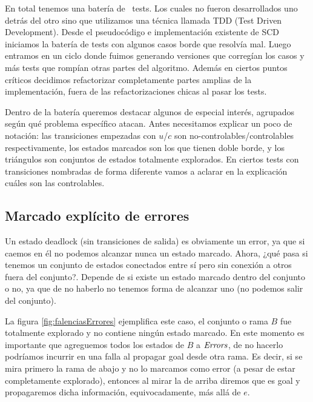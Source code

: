 En total tenemos una batería de \totalTests\ tests. Los cuales no fueron desarrollados uno detrás del otro sino que utilizamos una técnica llamada TDD (Test Driven Development). Desde el pseudocódigo e implementación existente de SCD iniciamos la batería de tests con algunos casos borde que resolvía mal.
Luego entramos en un ciclo donde fuimos generando versiones que corregían los casos y más tests que rompían otras partes del algoritmo. Además en ciertos puntos críticos decidimos refactorizar completamente partes amplias de la implementación, fuera de las refactorizaciones chicas al pasar los tests.

Dentro de la batería queremos destacar algunos de especial interés, agrupados según qué problema específico atacan. Antes necesitamos explicar un poco de notación: las transiciones empezadas con $u$/$c$ son no-controlables/controlables respectivamente, los estados marcados son los que tienen doble borde, y los triángulos son conjuntos de estados totalmente explorados. En ciertos tests con transiciones nombradas de forma diferente vamos a aclarar en la explicación cuáles son las controlables.
\bigskip

\FloatBarrier
\subsection{Marcado explícito de errores}\label{marcarErrores}

Un estado deadlock (sin transiciones de salida) es obviamente un error, ya que si caemos en él no podemos alcanzar nunca un estado marcado. Ahora, ¿qué pasa si tenemos un conjunto de estados conectados entre sí pero sin conexión a otros fuera del conjunto?. Depende de si existe un estado marcado dentro del conjunto o no, ya que de no haberlo no tenemos forma de alcanzar uno (no podemos salir del conjunto). 

La figura \ref{fig:falenciasErrores} ejemplifica este caso, el conjunto o rama $B$ fue totalmente explorado y no contiene ningún estado marcado. En este momento es importante que agreguemos todos los estados de $B$ a $\mathit{Errors}$, de no hacerlo podríamos incurrir en una falla al propagar goal desde otra rama. Es decir, si se mira primero la rama de abajo y no lo marcamos como error (a pesar de estar completamente explorado), entonces al mirar la de arriba diremos que es goal y propagaremos dicha información, equivocadamente, más allá de $e$. 

